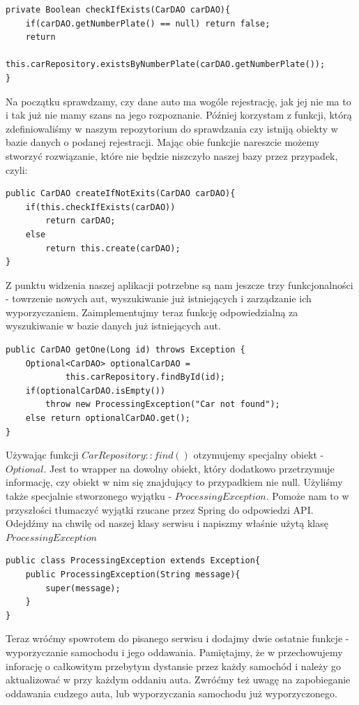 \documentclass{article}
\begin{document}
        \begin{verbatim}
private Boolean checkIfExists(CarDAO carDAO){
    if(carDAO.getNumberPlate() == null) return false;
    return
            this.carRepository.existsByNumberPlate(carDAO.getNumberPlate());
}
        \end{verbatim}
        Na początku sprawdzamy, czy dane auto ma wogóle rejestrację, jak jej nie ma to i tak już nie mamy szans na jego rozpoznanie. Później korzystam z funkcji, którą zdefiniowaliśmy w naszym repozytorium do sprawdzania czy istniją obiekty w bazie danych o podanej rejestracji. Mając obie funkcjie nareszcie możemy stworzyć rozwiązanie, które nie będzie niszczyło naszej bazy przez przypadek, czyli:
        \begin{verbatim}
public CarDAO createIfNotExits(CarDAO carDAO){
    if(this.checkIfExists(carDAO))
        return carDAO;
    else
        return this.create(carDAO);
}
        \end{verbatim}
        Z punktu widzenia naszej aplikacji potrzebne są nam jeszcze trzy funkcjonalności - towrzenie nowych aut, wyszukiwanie już istniejących i zarządzanie ich wyporzyczaniem. Zaimplementujmy teraz funkcję odpowiedzialną za wyszukiwanie w bazie danych już istniejących aut.
        \begin{verbatim}
public CarDAO getOne(Long id) throws Exception {
    Optional<CarDAO> optionalCarDAO =
            this.carRepository.findById(id);
    if(optionalCarDAO.isEmpty())
        throw new ProcessingException("Car not found");
    else return optionalCarDAO.get();
}
        \end{verbatim}
        Używając funkcji $CarRepository::find()$ otzymujemy specjalny obiekt - $Optional$. Jest to wrapper na dowolny obiekt, który dodatkowo przetrzymuje informację, czy obiekt w nim się znajdujący to przypadkiem nie null. Użyliśmy także specjalnie stworzonego wyjątku - $ProcessingException$. Pomoże nam to w przyszłości tłumaczyć wyjątki rzucane przez Spring do odpowiedzi API. Odejdźmy na chwilę od naszej klasy serwisu i napiszmy właśnie użytą klasę $ProcessingException$
        \begin{verbatim}
public class ProcessingException extends Exception{
    public ProcessingException(String message){
        super(message);
    }
}
        \end{verbatim}
        Teraz wróćmy spowrotem do pisanego serwisu i dodajmy dwie ostatnie funkcje - wyporzyczanie samochodu i jego oddawania. Pamiętajmy, że w przechowujemy inforację o całkowitym przebytym dystansie przez każdy samochód i należy go aktualizować w przy każdym oddaniu auta. Zwróćmy też uwagę na zapobieganie oddawania cudzego auta, lub wyporzyczania samochodu już wyporzyczonego.
\end{document}
